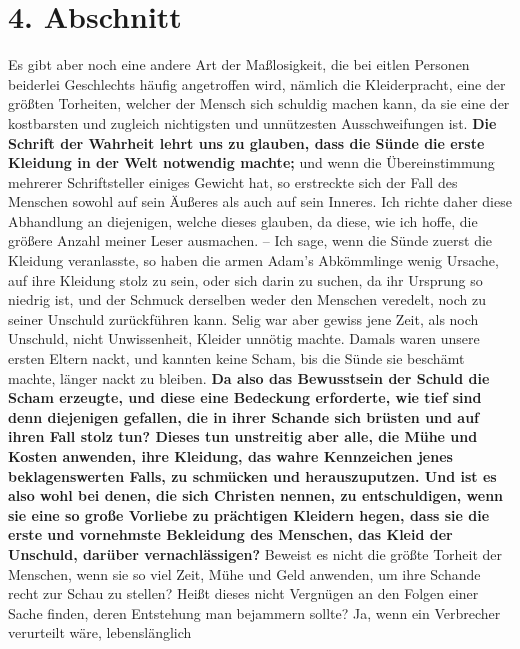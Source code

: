 \section{4. Abschnitt} \label{kap14_ab4}

Es gibt aber noch eine andere Art der Maßlosigkeit, die bei eitlen Personen beiderlei
Geschlechts häufig angetroffen wird, nämlich die Kleiderpracht,
eine der
größten Torheiten, welcher der Mensch sich schuldig machen kann, da sie eine
der kostbarsten und zugleich nichtigsten und unnützesten Ausschweifungen ist.
\textbf{Die
Schrift der Wahrheit lehrt uns zu glauben, dass die Sünde die erste Kleidung in
der
Welt notwendig machte;}
und wenn die Übereinstimmung
mehrerer Schriftsteller einiges Gewicht hat, so erstreckte sich der Fall des
Menschen sowohl auf sein Äußeres als auch auf sein Inneres. Ich richte daher
diese
Abhandlung an diejenigen, welche dieses glauben, da diese, wie ich hoffe, die
größere Anzahl meiner Leser ausmachen. -- Ich sage, wenn die Sünde zuerst die
Kleidung veranlasste, so haben die armen Adam’s
Abkömmlinge wenig Ursache, auf
ihre Kleidung stolz zu sein, oder sich darin zu suchen, da ihr Ursprung so
niedrig ist, und der Schmuck derselben weder den Menschen veredelt, noch zu
seiner Unschuld zurückführen kann. Selig war aber gewiss jene Zeit, als noch
Unschuld, nicht Unwissenheit, Kleider unnötig machte. Damals waren unsere ersten
Eltern nackt, und kannten keine Scham, bis die Sünde sie beschämt
machte,
länger nackt zu bleiben. \label{ref:14_04_wahre_nachfolger_kleidung}
\textbf{Da also das Bewusstsein der Schuld die Scham erzeugte,
und diese eine Bedeckung erforderte, wie tief sind denn diejenigen gefallen, die
in ihrer Schande sich brüsten und auf ihren Fall stolz tun? Dieses tun
unstreitig aber alle, die Mühe und Kosten anwenden, ihre Kleidung, das wahre
Kennzeichen jenes beklagenswerten Falls, zu schmücken und herauszuputzen. Und
ist es also wohl bei denen, die sich Christen nennen, zu entschuldigen, wenn sie
eine so große Vorliebe zu prächtigen Kleidern hegen, dass sie die erste und
vornehmste Bekleidung des Menschen, das Kleid der Unschuld, darüber
vernachlässigen?} Beweist es nicht die größte Torheit der Menschen, wenn sie so
viel Zeit, Mühe und Geld anwenden, um ihre Schande recht zur Schau zu stellen?
Heißt dieses nicht Vergnügen an den Folgen einer Sache finden, deren Entstehung
man bejammern sollte? Ja, wenn ein Verbrecher verurteilt wäre, lebenslänglich
